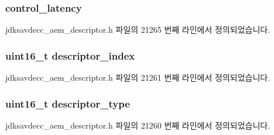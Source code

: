 \subsubsection[{\texorpdfstring{control\+\_\+latency}{control_latency}}]{ control\+\_\+latency}\hypertarget{structjdksavdecc__descriptor__signal__splitter_ab2bd4639caaf9a8078b68368afbd63b6}{}\label{structjdksavdecc__descriptor__signal__splitter_ab2bd4639caaf9a8078b68368afbd63b6}


jdksavdecc\+\_\+aem\+\_\+descriptor.\+h 파일의 21265 번째 라인에서 정의되었습니다.

\subsubsection[{\texorpdfstring{descriptor\+\_\+index}{descriptor_index}}]{\setlength{\rightskip}{0pt plus 5cm}uint16\+\_\+t descriptor\+\_\+index}\hypertarget{structjdksavdecc__descriptor__signal__splitter_a042bbc76d835b82d27c1932431ee38d4}{}\label{structjdksavdecc__descriptor__signal__splitter_a042bbc76d835b82d27c1932431ee38d4}


jdksavdecc\+\_\+aem\+\_\+descriptor.\+h 파일의 21261 번째 라인에서 정의되었습니다.

\subsubsection[{\texorpdfstring{descriptor\+\_\+type}{descriptor_type}}]{\setlength{\rightskip}{0pt plus 5cm}uint16\+\_\+t descriptor\+\_\+type}\hypertarget{structjdksavdecc__descriptor__signal__splitter_ab7c32b6c7131c13d4ea3b7ee2f09b78d}{}\label{structjdksavdecc__descriptor__signal__splitter_ab7c32b6c7131c13d4ea3b7ee2f09b78d}


jdksavdecc\+\_\+aem\+\_\+descriptor.\+h 파일의 21260 번째 라인에서 정의되었습니다.

